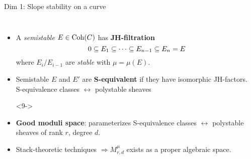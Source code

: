 \documentclass[8pt]{beamer} %
\begin{document}
\begin{frame}[fragile]{Dim 1: Slope stability on a curve}
\begin{columns}[t]
    \begin{itemize}
        \item<7-> A \textit{semistable} $E \in \mathrm{Coh}(C)$ has \textbf{JH-filtration}
        \[ 0 \subseteq E_1 \subseteq \cdots \subseteq E_{n-1} \subseteq E_n = E \]
        where $E_i/E_{i-1}$ are \textit{stable} with $\mu = \mu(E)$.
        \item<8-> Semistable $E$ and $E'$ are \textbf{S-equivalent} if they have isomorphic JH-factors. \\
        S-equivalence classes $\leftrightarrow$ polystable sheaves
        \item[]<9->
        \begin{center}
        \end{center}
        \item<9-> \textbf{Good moduli space}: parameterizes S-equivalence classes $\leftrightarrow$ polystable sheaves of rank $r$, degree $d$.
        \item<10-> Stack-theoretic techniques $\Rightarrow M^\mu_{r,d}$ exists as a proper algebraic space.
    \end{itemize}
\end{columns}
\end{frame}
\end{document}
